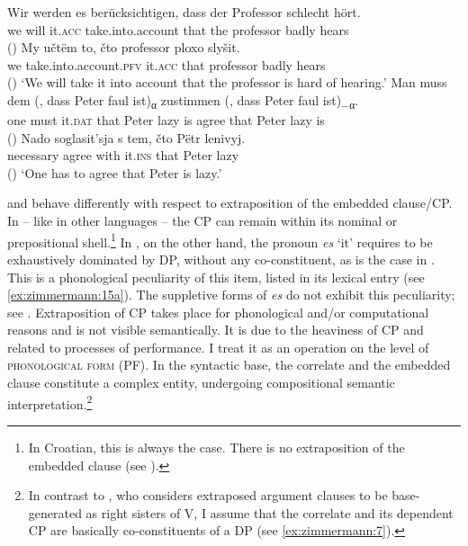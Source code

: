 \documentclass[output=paper]{langscibook}
\begin{document}
\ea
    \ea\label{ex:zimmermann:1a}\gll Wir werden es berücksichtigen, dass der Professor schlecht hört.\\
    we will it.\textsc{acc} take.into.account that the professor badly hears\\ \hfill ()
    \ex\label{ex:zimmermann:1b}\gll My učtëm to, čto professor ploxo slyšit. \\
    we take.into.account.\textsc{pfv} it.\textsc{acc} that professor badly hears\\ \hfill ()
    \z
    \glt `We will take it into account that the professor is hard of hearing.'
\ex\label{ex:zimmermann:2}
    \ea\label{ex:zimmermann:2a}\gll Man muss dem (, dass Peter faul ist)\textsubscript{α} zustimmen (, dass Peter faul ist)\textsubscript{$-$α}.\\
    one must it.\textsc{dat} {} that Peter lazy is agree {} that Peter lazy is\\ \hfill ()
    \ex\label{ex:zimmermann:2b}\gll Nado soglasit'sja s tem, čto Pëtr lenivyj.\\
    necessary agree with it.\textsc{ins} that Peter lazy \\ \hfill ()
    \z
    \glt `One has to agree that Peter is lazy.'
\z

\noindent {} and  behave differently with respect to extraposition of the embedded clause/CP. In  -- like in other  languages -- the CP can remain within its nominal or prepositional shell.\footnote{In Croatian, this is always the case. There is no extraposition of the embedded clause (see \citealt{Willer-Gold2013}).} In , on the other hand, the pronoun \textit{es} `it' requires to be exhaustively dominated by DP, without any co-constituent, as is the case in . This is a phonological peculiarity of this item, listed in its lexical entry (see \ref{ex:zimmermann:15a}). The suppletive forms of \textit{es} do not exhibit this peculiarity; see . Extraposition of CP takes place for phonological and/or computational reasons and is not visible semantically. It is due to the heaviness of CP and related to processes of performance. I treat it as an operation on the level of \textsc{phonological form} (PF). In the syntactic base, the correlate and the embedded clause constitute a complex entity, undergoing compositional semantic interpretation.\footnote{In contrast to \citet[233ff.]{Haider2010}, who considers extraposed argument clauses to be base-generated as right sisters of V, I assume that the correlate and its dependent CP are basically co-constituents of a DP (see \ref{ex:zimmermann:7}).}
\end{document}

